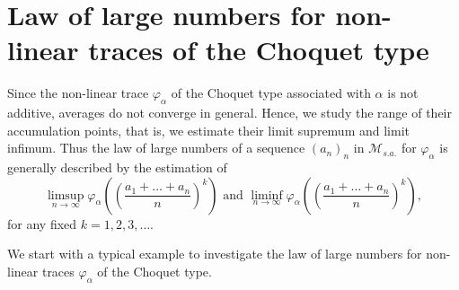 \documentclass[a4paper,12pt]{amsart}
\newcommand{\M}{\mathcal{M}}
\begin{document}
\section{Law of large numbers for non-linear traces of the Choquet type}

Since the non-linear trace $\varphi_{\alpha}$ of the Choquet type associated with $\alpha$ is not additive, 
averages do not converge in general.  Hence, we study the range of their accumulation points, that is, 
we estimate their limit supremum and limit infimum. Thus 
the law of large numbers of a sequence $(a_n)_n$ in $\M_{s.a.}$ for  $\varphi_{\alpha}$ is 
generally described by the estimation of 
\[  \limsup _{n \to \infty} \varphi_{\alpha}((\frac{a_1 + \dots + a_n}{n})^k) \text{ and }  
     \liminf _{n \to \infty} \varphi_{\alpha}((\frac{a_1 + \dots + a_n}{n})^k), \]
for any fixed $k =1,2,3, \dots$. 

We start with a typical example to investigate the law of large numbers for non-linear traces $\varphi_{\alpha}$ of the Choquet type. 
\end{document}
